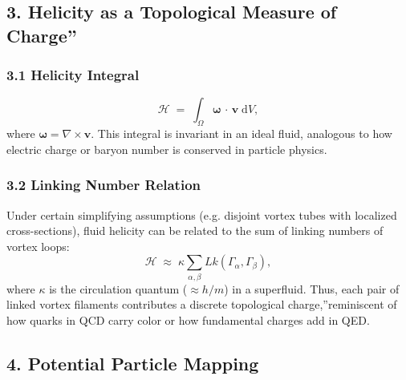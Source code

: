 \documentclass[a4paper,12pt]{article}
\begin{document}
\subsection*{3. Helicity as a Topological Measure of \grqq Charge\textquotedblright}

\subsubsection*{3.1 Helicity Integral}

\[
    \mathcal{H}
    \;=\;
    \int_{\Omega}
    \boldsymbol{\omega}\,\cdot\,\mathbf{v}\;\mathrm{d}V,
\]
where \(\boldsymbol{\omega} = \nabla \times \mathbf{v}\). This integral is invariant in an ideal fluid, analogous to how electric charge or baryon number is conserved in particle physics.

\subsubsection*{3.2 Linking Number Relation}

Under certain simplifying assumptions (e.g. disjoint vortex tubes with localized cross-sections), fluid helicity can be related to the sum of linking numbers of vortex loops:
\[
    \mathcal{H}
    \;\approx\;
    \kappa
    \sum_{\alpha,\beta} Lk(\Gamma_\alpha, \Gamma_\beta),
\]
where \(\kappa\) is the circulation quantum (\(\approx h/m\)) in a superfluid. Thus, each pair of linked vortex filaments contributes a discrete topological \grqq charge,\textquotedblright reminiscent of how quarks in QCD carry color or how fundamental charges add in QED.

\subsection*{4. Potential Particle Mapping}
\end{document}
